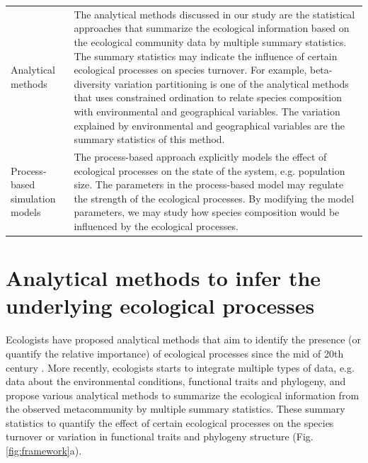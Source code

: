 {\begin{footnotesize}
\begin{longtable}{p{}p{}}
			Analytical methods & The analytical methods discussed in our study are the statistical approaches that summarize the ecological information based on the ecological community data by multiple summary statistics. The summary statistics may indicate the influence of certain ecological processes on species turnover. For example, beta-diversity variation partitioning is one of the analytical methods that uses constrained ordination to relate species composition with environmental and geographical variables. The variation explained by environmental and geographical variables are the summary statistics of this method.\\
			Process-based simulation models & The process-based approach explicitly models the effect of ecological processes on the state of the system, e.g. population size. The parameters in the process-based model may regulate the strength of the ecological processes. By modifying the model parameters, we may study how species composition would be influenced by the ecological processes.\\
			\bottomrule
		\end{longtable}
	\end{footnotesize}
}
\DIFaddend 

\section{Analytical methods to infer the underlying ecological processes}
\noindent
Ecologists have proposed \DIFaddbegin {}\DIFaddend analytical methods that aim to identify the presence (or quantify the relative importance) of \DIFdelbegin {}\DIFdelend \DIFaddbegin {}\DIFaddend ecological processes since the mid of 20th century \citep{macarthur1958population, diamond1975island}. More recently, ecologists starts to integrate multiple types of data, e.g. data about the environmental conditions, functional traits and phylogeny, and propose various analytical methods to summarize the ecological information from the observed metacommunity by multiple summary statistics. These summary statistics \DIFdelbegin {}\DIFdelend \DIFaddbegin {}\DIFaddend to quantify the effect of certain ecological processes on the species turnover or variation in functional traits and phylogeny structure (Fig. \ref{fig:framework}a). 

